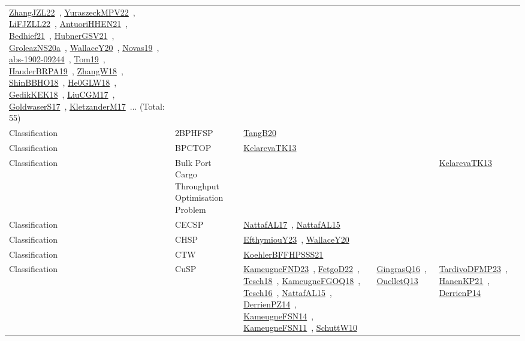 {\begin{longtable}{lp{3cm}>{\raggedright\arraybackslash}p{6cm}>{\raggedright\arraybackslash}p{6cm}>{\raggedright\arraybackslash}p{8cm}}
\href{papers/ZhangJZL22.pdf}{ZhangJZL22}~\cite{ZhangJZL22}, \href{articles/YuraszeckMPV22.pdf}{YuraszeckMPV22}~\cite{YuraszeckMPV22}, \href{papers/LiFJZLL22.pdf}{LiFJZLL22}~\cite{LiFJZLL22}, \href{papers/AntuoriHHEN21.pdf}{AntuoriHHEN21}~\cite{AntuoriHHEN21}, \href{articles/Bedhief21.pdf}{Bedhief21}~\cite{Bedhief21}, \href{articles/HubnerGSV21.pdf}{HubnerGSV21}~\cite{HubnerGSV21}, \href{papers/GroleazNS20a.pdf}{GroleazNS20a}~\cite{GroleazNS20a}, \href{articles/WallaceY20.pdf}{WallaceY20}~\cite{WallaceY20}, \href{articles/Novas19.pdf}{Novas19}~\cite{Novas19}, \href{articles/abs-1902-09244.pdf}{abs-1902-09244}~\cite{abs-1902-09244}, \href{papers/Tom19.pdf}{Tom19}~\cite{Tom19}, \href{articles/HauderBRPA19.pdf}{HauderBRPA19}~\cite{HauderBRPA19}, \href{articles/ZhangW18.pdf}{ZhangW18}~\cite{ZhangW18}, \href{articles/ShinBBHO18.pdf}{ShinBBHO18}~\cite{ShinBBHO18}, \href{papers/He0GLW18.pdf}{He0GLW18}~\cite{He0GLW18}, \href{articles/GedikKEK18.pdf}{GedikKEK18}~\cite{GedikKEK18}, \href{papers/LiuCGM17.pdf}{LiuCGM17}~\cite{LiuCGM17}, \href{papers/GoldwaserS17.pdf}{GoldwaserS17}~\cite{GoldwaserS17}, \href{papers/KletzanderM17.pdf}{KletzanderM17}~\cite{KletzanderM17}... (Total: 55)\\
Classification & 2BPHFSP & \href{papers/TangB20.pdf}{TangB20}~\cite{TangB20} &  & \\
Classification & BPCTOP & \href{papers/KelarevaTK13.pdf}{KelarevaTK13}~\cite{KelarevaTK13} &  & \\
Classification & Bulk Port Cargo Throughput Optimisation Problem &  &  & \href{papers/KelarevaTK13.pdf}{KelarevaTK13}~\cite{KelarevaTK13}\\
Classification & CECSP & \href{articles/NattafAL17.pdf}{NattafAL17}~\cite{NattafAL17}, \href{articles/NattafAL15.pdf}{NattafAL15}~\cite{NattafAL15} &  & \\
Classification & CHSP & \href{papers/EfthymiouY23.pdf}{EfthymiouY23}~\cite{EfthymiouY23}, \href{articles/WallaceY20.pdf}{WallaceY20}~\cite{WallaceY20} &  & \\
Classification & CTW & \href{articles/KoehlerBFFHPSSS21.pdf}{KoehlerBFFHPSSS21}~\cite{KoehlerBFFHPSSS21} &  & \\
Classification & CuSP & \href{papers/KameugneFND23.pdf}{KameugneFND23}~\cite{KameugneFND23}, \href{articles/FetgoD22.pdf}{FetgoD22}~\cite{FetgoD22}, \href{papers/Tesch18.pdf}{Tesch18}~\cite{Tesch18}, \href{papers/KameugneFGOQ18.pdf}{KameugneFGOQ18}~\cite{KameugneFGOQ18}, \href{papers/Tesch16.pdf}{Tesch16}~\cite{Tesch16}, \href{articles/NattafAL15.pdf}{NattafAL15}~\cite{NattafAL15}, \href{papers/DerrienPZ14.pdf}{DerrienPZ14}~\cite{DerrienPZ14}, \href{articles/KameugneFSN14.pdf}{KameugneFSN14}~\cite{KameugneFSN14}, \href{papers/KameugneFSN11.pdf}{KameugneFSN11}~\cite{KameugneFSN11}, \href{papers/SchuttW10.pdf}{SchuttW10}~\cite{SchuttW10} & \href{papers/GingrasQ16.pdf}{GingrasQ16}~\cite{GingrasQ16}, \href{papers/OuelletQ13.pdf}{OuelletQ13}~\cite{OuelletQ13} & \href{papers/TardivoDFMP23.pdf}{TardivoDFMP23}~\cite{TardivoDFMP23}, \href{papers/HanenKP21.pdf}{HanenKP21}~\cite{HanenKP21}, \href{papers/DerrienP14.pdf}{DerrienP14}~\cite{DerrienP14}\\

\end{longtable}}
